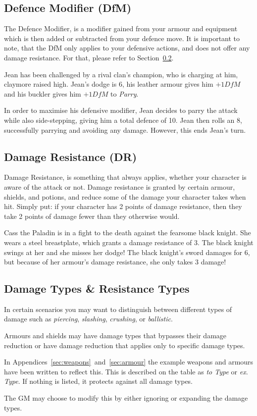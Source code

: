 \subsection{Defence Modifier (DfM)}\label{sec:defence-modifier}
The Defence Modifier, is a modifier gained from your armour and equipment which is then added or subtracted from your defence move.
It is important to note, that the DfM only applies to your defensive actions, and does not offer any damage resistance. 
For that, please refer to Section~\ref{sec:damage-resistance}.

\begin{example}
    Jean has been challenged by a rival clan's champion, who is charging at him, claymore raised high.
    Jean's dodge is 6, his leather armour gives him $+1 \mathit{DfM}$ and his buckler gives him $+1 \mathit{DfM}$ to \textit{Parry}.

    In order to maximise his defensive modifier, Jean decides to parry the attack while also side-stepping, giving him a total defence of 10.
    Jean then rolls an 8, successfully parrying and avoiding any damage.
    However, this ends Jean's turn.
\end{example}

\subsection{Damage Resistance (DR)}\label{sec:damage-resistance}
Damage Resistance, is something that always applies, whether your character is aware of the attack or not.
Damage resistance is granted by certain armour, shields, and potions, and reduce some of the damage your character takes when hit.
Simply put: if your character has 2 points of damage resistance, then they take 2 points of damage fewer than they otherwise would.

\begin{example} 
    Cass the Paladin is in a fight to the death against the fearsome black knight.
    She wears a steel breastplate, which grants a damage resistance of 3.
    The black knight swings at her and she misses her dodge!
    The black knight's sword damages for 6, but because of her armour's damage resistance, she only takes 3 damage!
\end{example}

\subsection{Damage Types \& Resistance Types}
In certain scenarios you may want to distinguish between different types of damage such as \textit{piercing}, \textit{slashing}, \textit{crushing}, or \textit{ballistic}.

Armours and shields may have damage types that bypasses their damage reduction or have damage reduction that applies only to specific damage types.

In Appendices~\ref{sec:weapons}~and~\ref{sec:armour} the example weapons and armours have been written to reflect this.
This is described on the table as \textit{to Type} or \textit{ex. Type}.
If nothing is listed, it protects against all damage types.

The GM may choose to modify this by either ignoring or expanding the damage types.